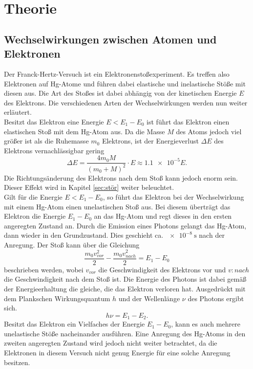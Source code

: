 \section{Theorie}
\label{sec:Theorie}
\subsection{Wechselwirkungen zwischen Atomen und Elektronen}
\label{sec:wechsel}
Der Franck-Hertz-Versuch ist ein Elektronenstoßexperiment. Es treffen also Elektronen auf Hg-Atome und führen dabei elastische und 
inelastische Stöße mit diesen aus. Die Art des Stoßes ist dabei abhängig von der kinetischen Energie $E$ des Elektrons. Die verschiedenen
Arten der Wechselwirkungen werden nun weiter erläutert.
\\\noindent
Besitzt das Elektron eine Energie $E<E_1-E_0$ ist führt das Elektron einen elastischen Stoß mit dem Hg-Atom aus. Da die Masse $M$ des Atoms 
jedoch viel größer ist als die Ruhemasse $m_0$ Elektrons, ist der Energieverlust $\Delta E$ des Elektrons vernachlässigbar gering
\begin{equation*}
    \Delta E=\frac{4m_0M}{(m_0+M)^2}\cdot E\approx \num{1.1e-5}E    .
\end{equation*} 
Die Richtungsänderung des Elektrons nach dem Stoß kann jedoch enorm sein. Dieser Effekt wird in Kapitel \ref{sec:stör} weiter beleuchtet.
\\\noindent
Gilt für die Energie $E<E_1-E_0$, so führt das Elektron bei der Wechselwirkung mit einem Hg-Atom einen unelastischen Stoß aus. Bei diesem
überträgt das Elektron die Energie $E_1-E_0$ an das Hg-Atom und regt dieses in den ersten angeregten Zustand an. Durch die Emission eines
Photons gelangt das Hg-Atom, dann wieder in den Grundzustand. Dies geschieht ca. $\SI{e-8}{\second}$ nach der Anregung. Der Stoß kann über 
die Gleichung 
\begin{equation}
    \frac{m_0v_{vor}^2}{2}-\frac{m_0v_{nach}^2}{2}=E_1-E_0
    \label{eqn:stoß}
\end{equation}
beschrieben werden, wobei $v_{vor}$ die Geschwindigkeit des Elektrons vor und $v:{nach}$ die Geschwindigkeit nach dem Stoß ist. 
Die Energie des Photons ist dabei gemäß der Energieerhaltung die gleiche, die das Elektron verloren hat.
Ausgedrückt mit dem Plankschen Wirkungsquantum $h$ und der Wellenlänge $\nu$ des Photons ergibt sich. 
\begin{equation}
    h\nu=E_1-E_2    .
    \label{eqn:photon}
\end{equation}
Besitzt das Elektron ein Vielfaches der Energie $E_1-E_0$, kann es auch mehrere unelastische Stöße nacheinander ausführen. Eine Anregung 
des Hg-Atoms in den zweiten angeregten Zustand wird jedoch nicht weiter betrachtet, da die Elektronen in diesem Versuch nicht genug Energie
für eine solche Anregung besitzen.

